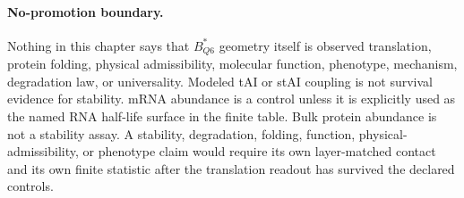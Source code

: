 \paragraph{No-promotion boundary.}
Nothing in this chapter says that $B^*_{Q6}$ geometry itself is observed translation, protein folding, physical admissibility, molecular function, phenotype, mechanism, degradation law, or universality.  Modeled tAI or stAI coupling is not survival evidence for stability.  mRNA abundance is a control unless it is explicitly used as the named RNA half-life surface in the finite table.  Bulk protein abundance is not a stability assay.  A stability, degradation, folding, function, physical-admissibility, or phenotype claim would require its own layer-matched contact and its own finite statistic after the translation readout has survived the declared controls.